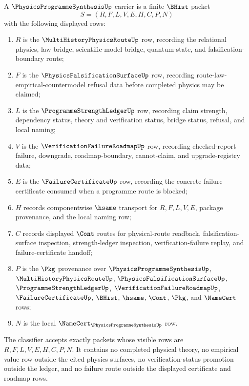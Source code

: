 \begin{definition}
\label{def:physics-programme-synthesis-carrier}
A $\PhysicsProgrammeSynthesisUp$ carrier is a finite $\BHist$ packet
$$
S=(R,F,L,V,E,H,C,P,N)
$$
with the following displayed rows:
\begin{enumerate}
\item $R$ is the $\MultiHistoryPhysicsRouteUp$ row, recording the relational physics, law bridge, scientific-model bridge, quantum-state, and falsification-boundary route;
\item $F$ is the $\PhysicsFalsificationSurfaceUp$ row, recording route-law-empirical-countermodel refusal data before completed physics may be claimed;
\item $L$ is the $\ProgrammeStrengthLedgerUp$ row, recording claim strength, dependency status, theory and verification status, bridge status, refusal, and local naming;
\item $V$ is the $\VerificationFailureRoadmapUp$ row, recording checked-report failure, downgrade, roadmap-boundary, cannot-claim, and upgrade-registry data;
\item $E$ is the $\FailureCertificateUp$ row, recording the concrete failure certificate consumed when a programme route is blocked;
\item $H$ records componentwise $\hsame$ transport for $R,F,L,V,E$, package provenance, and the local naming row;
\item $C$ records displayed $\Cont$ routes for physical-route readback, falsification-surface inspection, strength-ledger inspection, verification-failure replay, and failure-certificate handoff;
\item $P$ is the $\Pkg$ provenance over $\PhysicsProgrammeSynthesisUp$, $\MultiHistoryPhysicsRouteUp$, $\PhysicsFalsificationSurfaceUp$, $\ProgrammeStrengthLedgerUp$, $\VerificationFailureRoadmapUp$, $\FailureCertificateUp$, $\BHist$, $\hsame$, $\Cont$, $\Pkg$, and $\NameCert$ rows;
\item $N$ is the local $\NameCert_{\PhysicsProgrammeSynthesisUp}$ row.
\end{enumerate}
The classifier accepts exactly packets whose visible rows are $R,F,L,V,E,H,C,P,N$. It contains no completed physical theory, no empirical value row outside the cited physics surfaces, no verification-status promotion outside the ledger, and no failure route outside the displayed certificate and roadmap rows.
\end{definition}

